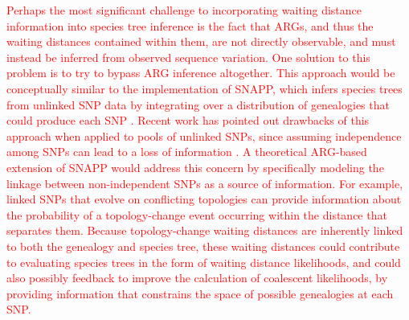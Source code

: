\documentclass[11pt]{article}
\begin{document}
% 
\textcolor{red}{
Perhaps the most significant challenge to incorporating waiting distance 
information into species tree inference is the fact that ARGs, and thus the
waiting distances contained within them, are not directly observable, and 
must instead be inferred from observed sequence variation. 
% 
One solution to this problem is to try to bypass ARG inference altogether.
This approach would be conceptually similar to the implementation of SNAPP, 
which infers species trees from unlinked SNP data by integrating over a 
distribution of genealogies that could produce each SNP \citep{bryant2012inferring}.
% 
Recent work has pointed out drawbacks of this approach when applied to
pools of unlinked SNPs, since assuming independence among SNPs can lead to a
loss of information \citep{zhu2021complexity}. 
% 
A theoretical ARG-based extension of SNAPP would address this concern by
specifically modeling the linkage between non-independent SNPs as a 
source of information.
% 
For example, linked SNPs that evolve on conflicting topologies can provide 
information about the probability of a topology-change event occurring
within the distance that separates them. 
Because topology-change waiting distances are inherently linked to both
the genealogy and species tree, these waiting distances could contribute
to evaluating species trees in the form of waiting distance likelihoods,
and could also possibly feedback to improve the calculation of coalescent likelihoods, by providing information that constrains the space of 
possible genealogies at each SNP.
}
% 
% 
% 
\end{document}
